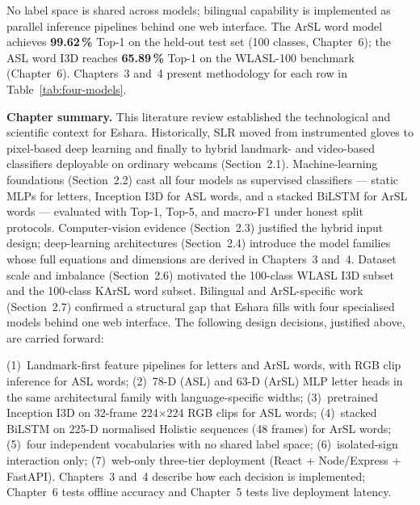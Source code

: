 \noindent No label space is shared across models; bilingual capability is implemented as parallel inference pipelines behind one web interface. The ArSL word model achieves \textbf{99.62\,\%} Top-1 on the held-out test set (100 classes, Chapter~6); the ASL word I3D reaches \textbf{65.89\,\%} Top-1 on the WLASL-100 benchmark (Chapter~6). Chapters~3 and~4 present methodology for each row in Table~\ref{tab:four-models}.\par\vspace{0.3cm}

\noindent\textbf{Chapter summary.} This literature review established the technological and scientific context for Eshara. Historically, SLR moved from instrumented gloves to pixel-based deep learning and finally to hybrid landmark- and video-based classifiers deployable on ordinary webcams (Section~2.1). Machine-learning foundations (Section~2.2) cast all four models as supervised classifiers --- static MLPs for letters, Inception I3D for ASL words, and a stacked BiLSTM for ArSL words --- evaluated with Top-1, Top-5, and macro-F1 under honest split protocols. Computer-vision evidence (Section~2.3) justified the hybrid input design; deep-learning architectures (Section~2.4) introduce the model families whose full equations and dimensions are derived in Chapters~3 and~4. Dataset scale and imbalance (Section~2.6) motivated the 100-class WLASL I3D subset and the 100-class KArSL word subset. Bilingual and ArSL-specific work (Section~2.7) confirmed a structural gap that Eshara fills with four specialised models behind one web interface. The following design decisions, justified above, are carried forward:\par\vspace{0.3cm}

\noindent (1)~Landmark-first feature pipelines for letters and ArSL words, with RGB clip inference for ASL words; (2)~78-D (ASL) and 63-D (ArSL) MLP letter heads in the same architectural family with language-specific widths; (3)~pretrained Inception I3D on 32-frame 224$\times$224 RGB clips for ASL words; (4)~stacked BiLSTM on 225-D normalised Holistic sequences (48 frames) for ArSL words; (5)~four independent vocabularies with no shared label space; (6)~isolated-sign interaction only; (7)~web-only three-tier deployment (React + Node/Express + FastAPI). Chapters~3 and~4 describe how each decision is implemented; Chapter~6 tests offline accuracy and Chapter~5 tests live deployment latency.\par

